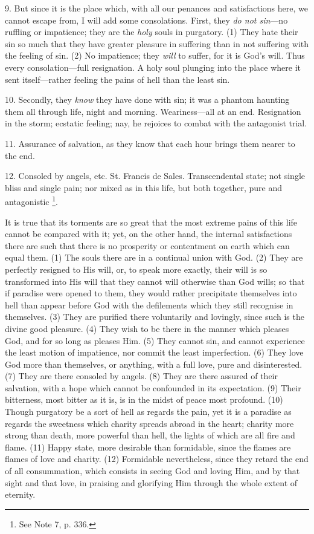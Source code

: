 9. But since it is the place which, with all our
penances and satisfactions here, we cannot escape from, I will add
some consolations. First, they \emph{do not sin}—no ruffling or
impatience; they are the \emph{holy} souls in purgatory. (1) They hate
their sin so much that they have greater pleasure in suffering than in
not suffering with the feeling of sin. (2) No impatience; they \emph{will}
to suffer, for it is God's will. Thus every consolation—full
resignation. A holy soul plunging into the place where it sent
itself—rather feeling the pains of hell than the least sin.

10. Secondly, they \emph{know} they have done
with sin; it was a phantom haunting them all through life, night and
morning. Weariness—all at an end. Resignation in the storm; ecstatic
feeling; nay, he rejoices to combat with the antagonist trial.

11. Assurance of salvation, as they know that
each hour brings them nearer to the end.

12. Consoled by angels, etc. St. Francis de
Sales. Transcendental state; not single bliss and single pain;
nor mixed as in this life, but both together, pure and antagonistic \footnote{See Note
7, p. 336.}.


It is true that its torments are so great that
the most extreme pains of this life cannot be compared with it; yet,
on the other hand, the internal satisfactions there are such that
there is no prosperity or contentment on earth which can equal them.
(1) The souls there are in a continual union with God. (2) They are
perfectly resigned to His will, or, to speak more exactly, their will
is so transformed into His will that they cannot will otherwise than
God wills; so that if paradise were opened to them, they would rather
precipitate themselves into hell than appear before God with the
defilements which they still recognise in themselves. (3) They are
purified there voluntarily and lovingly, since such is the divine good
pleasure. (4) They wish to be there in the manner which pleases God,
and for so long as pleases Him. (5) They cannot sin, and cannot
experience the least motion of impatience, nor commit the least
imperfection. (6) They love God more than themselves, or anything,
with a full love, pure and disinterested. (7) They are there consoled
by angels. (8) They are there assured of their salvation, with a hope
which cannot be confounded in its expectation. (9) Their bitterness,
most bitter as it is, is in the midst of peace most profound. (10)
Though purgatory be a sort of hell as regards the pain, yet it is
a paradise as regards the sweetness which charity spreads abroad in
the heart; charity more strong than death, more powerful than hell,
the lights of which are all fire and flame. (11) Happy state, more
desirable than formidable, since the flames are flames of love and
charity. (12) Formidable nevertheless, since they retard the end of
all consummation, which consists in seeing God and loving Him, and by
that sight and that love, in praising and glorifying Him through the
whole extent of eternity.

